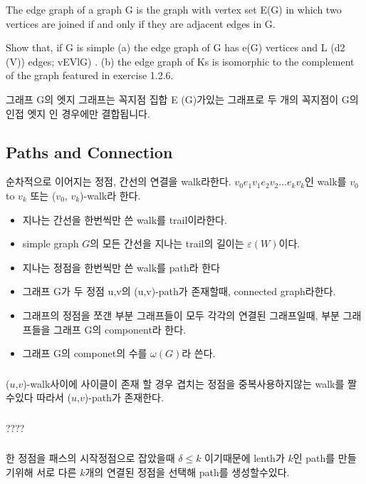 The edge graph of a graph G is the graph with vertex set E(G) in
which two vertices are joined if and only if they are adjacent edges in G. 

Show that, if G is simple
(a) the edge graph of G has e(G) vertices and L (d2 (V)) edges; vEVlG) .
(b) the edge graph of Ks is isomorphic to the complement of the graph featured in exercise 1.2.6.

그래프 G의 엣지 그래프는 꼭지점 집합 E (G)가있는 그래프로 두 개의 꼭지점이 G의 인접 엣지 인 경우에만 결합됩니다.

\subsection{Paths and Connection}
\begin{dfn}[walk]순차적으로 이어지는 정점, 간선의 연결을 walk라한다. $v_{0}e_{1}v_{1}e_{2}v_{2} ... e_{k}v_{k}$인 walk를 $v_0$ to $v_k$ 또는 ($v_0$, $v_k$)-walk라 한다.
    \begin{itemize}
        \item 지나는 간선을 한번씩만 쓴 walk를 trail이라한다.
        \item simple graph $G$의 모든 간선을 지나는 trail의 길이는 $\varepsilon (W)$이다.
        \item 지나는 정점을 한번씩만 쓴 walk를 path라 한다
        \item 그래프 G가 두 정점 u,v의  (u,v)-path가 존재할때, connected graph라한다.
        \item 그래프의 정점을 쪼갠 부분 그래프들이 모두 각각의 연결된 그래프일때, 부분 그래프들을 그래프 G의 component라 한다.
        \item 그래프 G의 componet의 수를 $\omega(G)$라 쓴다.
    \end{itemize}
\end{dfn}
\subsubsection{} 

($u$,$v$)-walk사이에 사이클이 존재 할 경우 겹치는 정점을 중복사용하지않는 walk를 짤수있다 따라서 ($u$,$v$)-path가 존재한다.
\subsubsection{} 
????

\subsubsection{} 
한 정점을 패스의 시작정점으로 잡았을때 $\delta \le k$ 이기때문에  lenth가 $k$인 path를 만들기위해 서로 다른 $k$개의 연결된 정점을 선택해 path를 생성할수있다.
